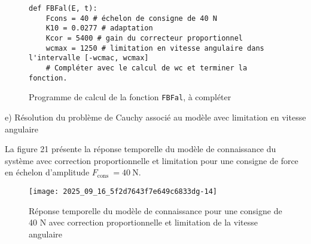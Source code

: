 \begin{figure}[!h]
\begin{lstlisting}
def FBFal(E, t):
    Fcons = 40 # échelon de consigne de 40 N
    K10 = 0.0277 # adaptation
    Kcor = 5400 # gain du correcteur proportionnel
    wcmax = 1250 # limitation en vitesse angulaire dans l'intervalle [-wcmac, wcmax]
    # Compléter avec le calcul de wc et terminer la fonction.
\end{lstlisting}

\caption{\label{ccs_mp_2023_fig_20}  Programme de calcul de la fonction \lstinline{FBFal}, à compléter}
\end{figure}


e) Résolution du problème de Cauchy associé au modèle avec limitation en vitesse angulaire

La figure 21 présente la réponse temporelle du modèle de connaissance du système avec correction proportionnelle et limitation pour une consigne de force en échelon d'amplitude $F_{\text {cons }}=40 \mathrm{~N}$.


\begin{figure}[!h]
\centering
\texttt{[image: 2025\_09\_16\_5f2d7643f7e649c6833dg-14]}
\caption{\label{ccs_mp_2023_fig_21}  Réponse temporelle du modèle de connaissance pour une consigne de 40 N avec correction proportionnelle et limitation de la vitesse angulaire}
\end{figure}



\ifprof
\begin{corrige}
\end{corrige}
\else
\fi



